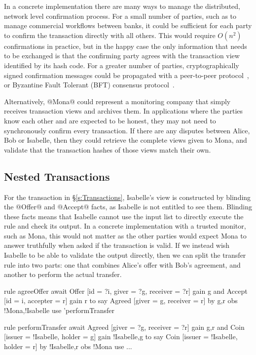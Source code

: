 In a concrete implementation there are many ways to manage the distributed, network level confirmation process. For a small number of parties, such as to manage commercial workflows between banks, it could be sufficient for each party to confirm the transaction directly with all others. This would require $O(n^2)$ confirmations in practice, but in the happy case the only information that needs to be exchanged is that the confirming party agrees with the transaction view identified by its hash code. For a greater number of parties, cryptographically signed confirmation messages could be propagated with a peer-to-peer protocol~\cite{El-Ansary2003:Broadcast}, or Byzantine Fault Tolerant (BFT) consensus protocol~\cite{Lamport1982:Byzantine, Ongaro2014:Consensus, Gilad2017:Algorand}.

Alternatively, @Mona@ could represent a monitoring company that simply receives transaction views and archives them. In applications where the parties know each other and are expected to be honest, they may not need to synchronously confirm every transaction. If there are any disputes between Alice, Bob or Isabelle, then they could retrieve the complete views given to Mona, and validate that the transaction hashes of those views match their own.

\eject{}
\subsection{Nested Transactions}
\label{s:NestedTransactions}
For the transaction in \S\ref{s:Transactions}, Isabelle's view is constructed by blinding the @Offer@ and @Accept@ facts, as Isabelle is not entitled to see them. Blinding these facts means that Isabelle cannot use the input list to directly execute the rule and check its output. In a concrete implementation with a trusted monitor, such as Mona, this would not matter as the other parties would expect Mona to answer truthfully when asked if the transaction is valid. If we instead wish Isabelle to be able to validate the output directly, then we can split the transfer rule into two parts: one that combines Alice's offer with Bob's agreement, and another to perform the actual transfer.

\begin{small}
\begin{code}
  rule  agreeOffer
  await Offer  [id = ?i, giver = ?g, receiver = ?r] gain {g}
    and Accept [id = i,  accepter = r]              gain {r}
  to
    say Agreed [giver = g, receiver = r]
     by {g,r}  obs {!Mona,!Isabelle} use {'performTransfer}

  rule  performTransfer
  await Agreed [giver = ?g, receiver = ?r]        gain {g,r}
   and  Coin   [issuer = !Isabelle, holder = g]
        gain {!Isabelle,g}
  to
    say Coin   [issuer = !Isabelle, holder = r]
     by {!Isabelle,r} obs {!Mona} use ...
\end{code}
\end{small}


